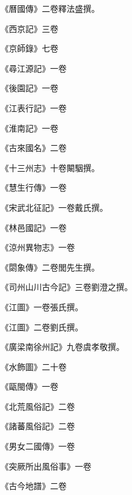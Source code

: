 \begin{pinyinscope}
 《曆國傳》二卷釋法盛撰。



 《西京記》三卷



 《京師錄》七卷



 《尋江源記》一卷



 《後園記》一卷



 《江表行記》一卷



 《淮南記》一卷



 《古來國名》二卷



 《十三州志》十卷闞駰撰。



 《慧生行傳》一卷



 《宋武北征記》一卷戴氏撰。



 《林邑國記》一卷



 《涼州異物志》一卷



 《閟象傳》二卷閭先生撰。



 《司州山川古今記》三卷劉澄之撰。



 《江圖》一卷張氏撰。



 《江圖》二卷劉氏撰。



 《廣梁南徐州記》九卷虞孝敬撰。



 《水飾圖》二十卷



 《甌閩傳》一卷



 《北荒風俗記》二卷



 《諸蕃風俗記》二卷



 《男女二國傳》一卷



 《突厥所出風俗事》一卷



 《古今地譜》二卷




\end{pinyinscope}
